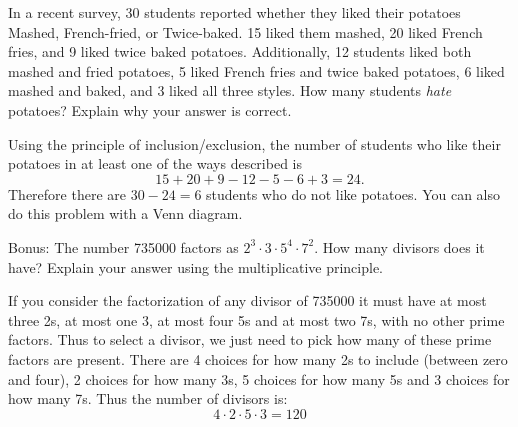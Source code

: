 \begin{questions}
\question[4] In a recent survey, 30 students reported whether they liked their potatoes Mashed, French-fried, or Twice-baked. 15 liked them mashed, 20 liked French fries, and 9 liked twice baked potatoes. Additionally, 12 students liked both mashed and fried potatoes, 5 liked French fries and twice baked potatoes, 6 liked mashed and baked, and 3 liked all three styles. How many students
{\em hate} potatoes?  Explain why your answer is correct.

	\begin{solution}
	  Using the principle of inclusion/exclusion, the number of students who like their potatoes in at least one of the ways described is \[15 + 20 + 9 - 12 - 5 - 6 + 3 = 24.\]  Therefore there are $30-24 = 6$ students who do not like potatoes.  You can also do this problem with a Venn diagram.
	\end{solution}



\bonusquestion[3] Bonus: The number 735000 factors as $2^3 \cdot 3 \cdot 5^4 \cdot 7^2$.  How many divisors does it have?  Explain your answer using the multiplicative principle.
	\begin{solution}
		If you consider the factorization of any divisor of 735000 it must have at most three 2s, at most one 3, at most four 5s and at most two 7s, with no other prime factors.  Thus to select a divisor, we just need to pick how many of these prime factors are present.  There are 4 choices for how many 2s to include (between zero and four), 2 choices for how many 3s, 5 choices for how many 5s and 3 choices for how many 7s.  Thus the number of divisors is:
		\[4\cdot 2 \cdot 5 \cdot 3 = 120\]
	\end{solution}




\end{questions}
